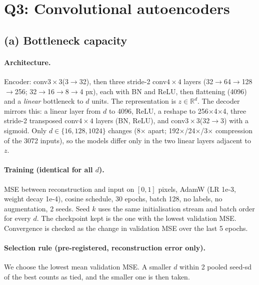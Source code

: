\section{Q3: Convolutional autoencoders}
\label{sec:q3}

\subsection{(a) Bottleneck capacity}
\paragraph{Architecture.} Encoder: conv$3{\times}3$(3$\to$32), then three stride-2 conv$4{\times}4$ layers
(32$\to$64$\to$128$\to$256; 32$\to$16$\to$8$\to$4 px), each with BN and ReLU, then flattening (4096) and a \emph{linear} bottleneck
to $d$ units. The representation is $z\in\mathbb{R}^d$. The decoder mirrors this: a linear layer from $d$ to 4096, ReLU, a reshape to
256$\times$4$\times$4, three stride-2 transposed conv$4{\times}4$ layers (BN, ReLU), and conv$3{\times}3$(32$\to$3) with a sigmoid. Only
$d\in\{16,128,1024\}$ changes (8$\times$ apart; 192$\times$/24$\times$/3$\times$ compression of the 3072 inputs), so the
models differ only in the two linear layers adjacent to $z$.
\paragraph{Training (identical for all $d$).} MSE between reconstruction and input on $[0,1]$ pixels, AdamW (LR 1e-3, weight
decay 1e-4), cosine schedule, 30 epochs, batch 128, no labels, no augmentation, 2 seeds. Seed $k$ uses the same initialisation stream
and batch order for every $d$. The checkpoint kept is the one with the lowest validation MSE. Convergence is checked as the change in
validation MSE over the last 5 epochs.
\paragraph{Selection rule (pre-registered, reconstruction error only).} We choose the lowest mean validation MSE. A smaller $d$
within 2 pooled seed-sd of the best counts as tied, and the smaller one is then taken.

